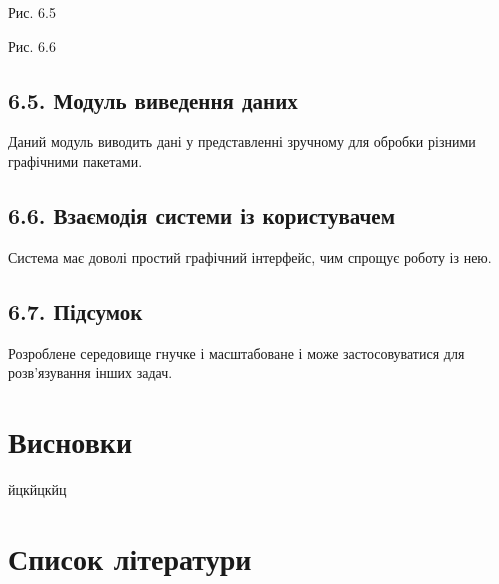 Рис. 6.5

Рис. 6.6

\hypertarget{ux43cux43eux434ux443ux43bux44c-ux432ux438ux432ux435ux434ux435ux43dux43dux44f-ux434ux430ux43dux438ux445}{%
\subsection{6.5. Модуль виведення
даних}\label{ux43cux43eux434ux443ux43bux44c-ux432ux438ux432ux435ux434ux435ux43dux43dux44f-ux434ux430ux43dux438ux445}}

Даний модуль виводить дані у представленні зручному для обробки різними
графічними пакетами.

\hypertarget{ux432ux437ux430ux454ux43cux43eux434ux456ux44f-ux441ux438ux441ux442ux435ux43cux438-ux456ux437-ux43aux43eux440ux438ux441ux442ux443ux432ux430ux447ux435ux43c}{%
\subsection{6.6. Взаємодія системи із
користувачем}\label{ux432ux437ux430ux454ux43cux43eux434ux456ux44f-ux441ux438ux441ux442ux435ux43cux438-ux456ux437-ux43aux43eux440ux438ux441ux442ux443ux432ux430ux447ux435ux43c}}

Система має доволі простий графічний інтерфейс, чим спрощує роботу із
нею.

\hypertarget{ux43fux456ux434ux441ux443ux43cux43eux43a-4}{%
\subsection{6.7.
Підсумок}\label{ux43fux456ux434ux441ux443ux43cux43eux43a-4}}

Розроблене середовище гнучке і масштабоване і може застосовуватися для
розв'язування інших задач.

\hypertarget{ux432ux438ux441ux43dux43eux432ux43aux438}{%
\section{\texorpdfstring{\hfill\break
Висновки}{ Висновки}}\label{ux432ux438ux441ux43dux43eux432ux43aux438}}

йцкйцкйц

\hypertarget{ux441ux43fux438ux441ux43eux43a-ux43bux456ux442ux435ux440ux430ux442ux443ux440ux438}{%
\section{Список
літератури}\label{ux441ux43fux438ux441ux43eux43a-ux43bux456ux442ux435ux440ux430ux442ux443ux440ux438}}

